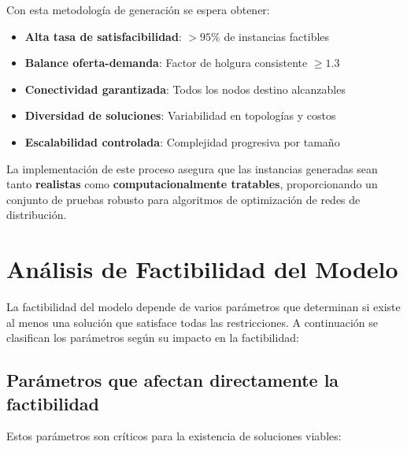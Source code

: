 \documentclass[12pt]{article}
\begin{document}
Con esta metodología de generación se espera obtener:

\begin{itemize}[leftmargin=*]
    \item \textbf{Alta tasa de satisfacibilidad}: $> 95\%$ de instancias factibles
    \item \textbf{Balance oferta-demanda}: Factor de holgura consistente $\geq 1.3$
    \item \textbf{Conectividad garantizada}: Todos los nodos destino alcanzables
    \item \textbf{Diversidad de soluciones}: Variabilidad en topologías y costos
    \item \textbf{Escalabilidad controlada}: Complejidad progresiva por tamaño
\end{itemize}

La implementación de este proceso asegura que las instancias generadas sean tanto \textbf{realistas} como \textbf{computacionalmente tratables}, proporcionando un conjunto de pruebas robusto para algoritmos de optimización de redes de distribución.

\vspace{16cm}



\section{Análisis de Factibilidad del Modelo}

La factibilidad del modelo depende de varios parámetros que determinan si existe al menos una solución que satisface todas las restricciones. A continuación se clasifican los parámetros según su impacto en la factibilidad:

\subsection*{Parámetros que afectan directamente la factibilidad}

Estos parámetros son críticos para la existencia de soluciones viables:
\end{document}
